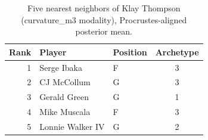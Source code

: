 \begin{table}[htbp]
  \centering\small
  \begin{tabular}{rllc}
    \toprule
    Rank & Player & Position & Archetype \\
    \midrule
    1 & Serge Ibaka & F & 3 \\
    2 & CJ McCollum & G & 3 \\
    3 & Gerald Green & G & 1 \\
    4 & Mike Muscala & F & 3 \\
    5 & Lonnie Walker IV & G & 2 \\
    \bottomrule
  \end{tabular}
  \caption{Five nearest neighbors of Klay Thompson (curvature_m3 modality), Procrustes-aligned posterior mean.}
  \label{tab:Klay_Thompson_neighbors_curvature_m3}
\end{table}

